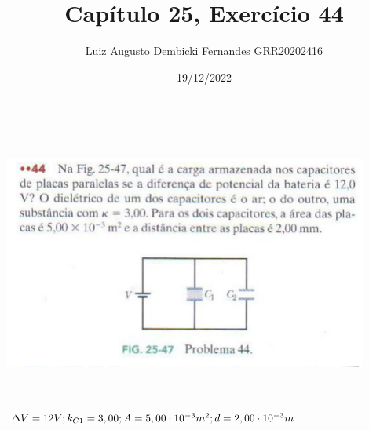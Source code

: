 \documentclass[12pt, twoside]{article}
\begin{document}
\title{Capítulo 25, Exercício 44}
\author{Luiz Augusto Dembicki Fernandes GRR20202416}
\date{19/12/2022}
\maketitle

\includegraphics[width=12cm, height=9cm]{44.png}

$ \Delta V = 12V \space ; k_{C1}= 3,00 \space ; A = 5,00\cdot 10^{-3} m^2 \space ; d = 2,00\cdot 10^{-3} m$ 
\end{document}
